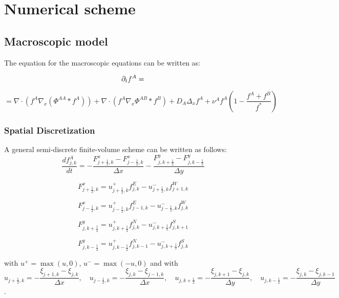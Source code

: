 	\section{Numerical scheme}
	\subsection{Macroscopic model}
	
The equation for the macroscopic equations can be written as:

\begin{equation}
 {\partial}_t f^{A}=
\end{equation}


\begin{equation}
 =  \nabla \cdot (f^A\nabla_x(\Phi^{AA}* f^A)) + \nabla \cdot (f^A \nabla_x \Phi^{AB}*f^B) + D_A \Delta_x f^A + \nu^{A}f^A\left( 1-\frac{f^A+f^B}{f^{*}} \right)
\end{equation}



\subsubsection{Spatial Discretization}


A general semi-discrete finite-volume scheme can be written as follows:
\begin{equation}
\frac{d f^{A}_{j,k}}{dt}= -\frac{F^{x}_{j+\frac{1}{2},k}-F^{x}_{j-\frac{1}{2},k}}{\Delta x}-\frac{F^{y}_{j,k+\frac{1}{2}}-F^{y}_{j,k-\frac{1}{2}}}{\Delta y}
\end{equation}

$$ F^{x}_{j+\frac{1}{2},k}=u^{+}_{j+\frac{1}{2},k}f^{E}_{j,k}-
u^{-}_{j+\frac{1}{2},k}f^{W}_{j+1,k}   $$

$$ F^{x}_{j-\frac{1}{2},k}=u^{+}_{j-\frac{1}{2},k}f^{E}_{j-1,k}-
u^{-}_{j-\frac{1}{2},k}f^{W}_{j,k}   $$

$$ F^{y}_{j,k+\frac{1}{2}}=u^{+}_{j,k+\frac{1}{2}}f^{N}_{j,k}-
u^{-}_{j,k+\frac{1}{2}}f^{S}_{j,k+1}   $$

$$ F^{y}_{j,k-\frac{1}{2}}=u^{+}_{j,k-\frac{1}{2}}f^{N}_{j,k-1}-
u^{-}_{j,k+\frac{1}{2}}f^{S}_{j,k}   $$

with $u^{+}=\max(u,0)$, $u^{-}=\max(-u,0)$ and with $$u_{j+\frac{1}{2},k}=-\frac{\xi_{j+1,k}-\xi_{j,k}}{\Delta x}, \quad u_{j-\frac{1}{2},k}=-\frac{\xi_{j,k}-\xi_{j-1,k}}{\Delta x}, \quad u_{j,k+\frac{1}{2}}=-\frac{\xi_{j,k+1}-\xi_{j,k}}{\Delta y}, \quad u_{j,k-\frac{1}{2}}=-\frac{\xi_{j,k}-\xi_{j,k-1}}{\Delta y}$$. \\

